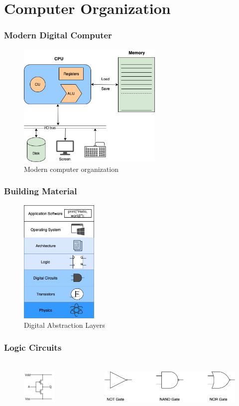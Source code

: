 \documentclass[xcolor={table, dvipsnames}]{beamer}
\begin{document}
\section{Computer Organization}

\begin{frame}
\frametitle{Modern Digital Computer}
\begin{figure}[h!]
  \includegraphics[height=6cm]{img/computer_organization.png}
    \caption{Modern computer organization}
\end{figure}
\end{frame}

\begin{frame}
\frametitle{Building Material}
\begin{figure}[h!]
  \includegraphics[height=6cm]{img/digital_abstraction.png}
    \caption{Digital Abstraction Layers}
\end{figure}
\end{frame}

\begin{frame}
\frametitle{Logic Circuits}
\begin{columns}
\begin{figure}[h!]
  \includegraphics[height=2cm]{img/CMOS_inverter.png}
\end{figure}
\begin{figure}[h!]
  \includegraphics[height=2cm]{img/basic_gates.png}
\end{figure}
\end{columns}
\end{frame}
\end{document}
